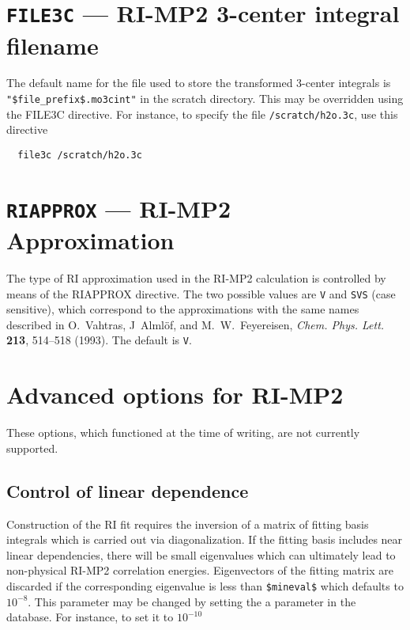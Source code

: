 \fussy


\section{{\tt FILE3C} --- RI-MP2 3-center integral filename}

\sloppy

The default name for the file used to store the transformed 3-center
integrals is \verb+"$file_prefix$.mo3cint"+ in the scratch directory.
This may be overridden using the FILE3C directive.  For instance, to
specify the file \verb+/scratch/h2o.3c+, use this directive
\begin{verbatim}
  file3c /scratch/h2o.3c
\end{verbatim}

\fussy


\section{{\tt RIAPPROX} --- RI-MP2 Approximation}

The type of RI approximation used in the RI-MP2 calculation is controlled
by means of the RIAPPROX directive.  The two possible values are
\verb+V+ and \verb+SVS+ (case sensitive), which correspond to the
approximations with the same names described in O.~Vahtras, J~Alml\"of,
and M.~W.~Feyereisen, {\em Chem. Phys. Lett.} {\bf 213}, 514--518
(1993).  The default is \verb+V+.


\section{Advanced options for RI-MP2}

These options, which functioned at the time of writing, are not
currently supported.

\subsection{Control of linear dependence}

Construction of the RI fit requires the inversion of a matrix of
fitting basis integrals which is carried out via diagonalization.  If
the fitting basis includes near linear dependencies, there will be
small eigenvalues which can ultimately lead to non-physical RI-MP2
correlation energies.  Eigenvectors of the fitting matrix 
are discarded if the corresponding eigenvalue is less than
\verb+$mineval$+ which defaults to $10^{-8}$.  This 
parameter may be changed by setting the a parameter in the database.
For instance, to set it to $10^{-10}$

